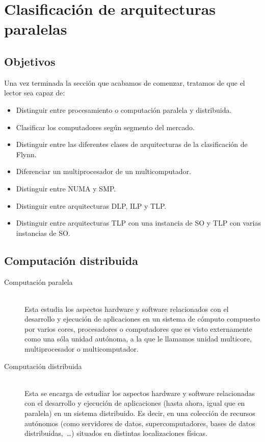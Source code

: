 \newpage
\section{Clasificación de arquitecturas paralelas}
\subsection{Objetivos}
Una vez terminada la sección que acabamos de comenzar, tratamos de que el lector sea capaz de:
\begin{itemize}
    \item Distinguir entre procesamiento o computación paralela y distribuida.
    \item Clasificar los computadores según segmento del mercado.
    \item Distinguir entre las diferentes clases de arquitecturas de la clasificación de Flynn.
    \item Diferenciar un multiprocesador de un multicomputador.
    \item Distinguir entre NUMA y SMP.
    \item Distinguir entre arquitecturas DLP, ILP y TLP.
    \item Distinguir entre arquitecturas TLP con una instancia de SO y TLP con varias instancias de SO.
\end{itemize}

\subsection{Computación distribuida}
\begin{description}
    \item [Computación paralela]~\\
        Esta estudia los aspectos hardware y software relacionados con el desarrollo y ejecución de aplicaciones en un sistema de cómputo compuesto por varios cores, procesadores o computadores que es visto externamente como una sóla unidad autónoma, a la que le llamamos unidad multicore, multiprocesador o multicomputador.

    \item [Computación distribuida]~\\
        Esta se encarga de estudiar los aspectos hardware y software relacionadas con el desarrollo y ejecución de aplicaciones (hasta ahora, igual que en paralela) en un sistema distribuido. Es decir, en una colección de recursos autónomos (como servidores de datos, supercomputadores, bases de datos distribuidas,~\ldots) situados en distintas localizaciones físicas.
\end{description}

